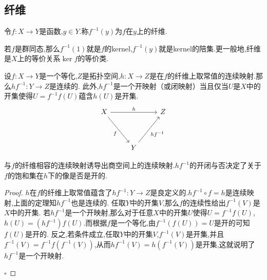 \documentclass[../../几何与拓扑.tex]{subfiles}
\begin{document}
\subsection{纤维}

\begin{definition}
    令$f:X\to Y$是函数,$y \in Y$.称$f^{-1}\left( y \right)$为$f$在$y$上的纤维.
\end{definition}

\begin{remark}
    若$f$是群同态,那么$f^{-1}\left( 1 \right)$就是$f$的kernel,$f^{-1}\left( y \right)$就是kernel的陪集.更一般地,纤维是$X$上的等价关系$\ker f$的等价类.
\end{remark}

\begin{theorem}
    设$f:X\to Y$是一个等化,$Z$是拓扑空间,$h:X\to Z$是在$f$的纤维上取常值的连续映射.那么$hf^{-1}:Y\to Z$是连续的.
此外,$h f^{-1}$是一个开映射（或闭映射）当且仅当$U$是$X$中的开集使得$U = f^{-1}f\left( U \right)$蕴含$h\left( U \right)$是开集.
\[
    \begin{tikzcd} X && Z \\ \\ & Y \arrow["h", from=1-1, to=1-3] \arrow["f"', from=1-1, to=3-2] \arrow["{hf^{-1}}"', from=3-2, to=1-3] \end{tikzcd}
\]
\end{theorem}

\begin{remark}
    与$f$的纤维相容的连续映射诱导出商空间上的连续映射.$hf^{-1}$的开闭与否决定了关于$f$的饱和集在$h$下的像是否是开的.
\end{remark}

\begin{proof}
    $h$在$f$的纤维上取常值蕴含了$hf^{-1}:Y\to Z$是良定义的.$hf^{-1}\circ f=h$是连续映射,上面的定理知$hf^{-1}$也是连续的.
任取$Y$中的开集$V$,那么$f$的连续性给出$f^{-1}\left( V \right)$是$X$中的开集.
若$hf^{-1}$是一个开映射,那么对于任意$X$中的开集$U$使得$U = f^{-1}f\left( U \right)$,$h\left( U \right)=\left( hf^{-1} \right)f\left( U \right)$.而根据$f$是一个等化,由$f^{-1}\left( f\left( U \right) \right)=U$是开的可知$f\left( U \right)$是开的.
反之,若条件成立,任取$Y$中的开集$V$,$f^{-1}\left( V \right)$是开集,并且$f^{-1}\left( V \right)=f^{-1}f\left( f^{-1}\left( V \right) \right)$,从而$hf^{-1}\left( V \right)=h\left( f^{-1}\left( V \right) \right)$是开集,这就说明了$hf^{-1}$是一个开映射.

    \hfill $\square$
\end{proof}
\end{document}
